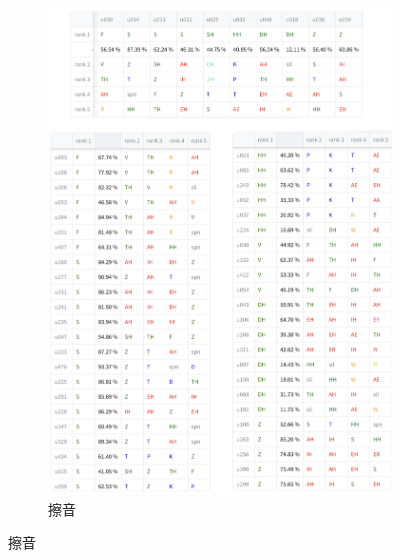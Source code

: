         {
        \newcommand{\tempwidth}[0]{0.8\linewidth}
        \begin{figure}
        \ContinuedFloat
             \centering
             \begin{subfigure}{\textwidth}
                 \centering
                 \includegraphics[width=\tempwidth]{chapters/fri_phn.png}
                 \caption{擦音}
                 \label{fig:hub-u050-ap0500-friobs}
             \end{subfigure}


\end{figure}}
